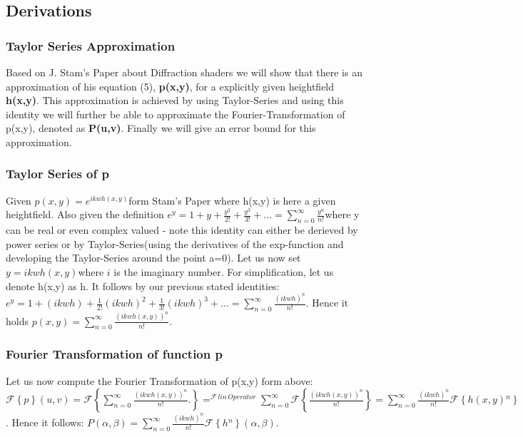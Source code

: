 \subsection{Derivations}
\subsubsection{Taylor Series Approximation}

Based on J. Stam's Paper about Diffraction shaders we will show that
there is an approximation of his equation (5), \textbf{p(x,y)}, for
a explicitly given heightfield \textbf{h(x,y)}. This approximation
is achieved by using Taylor-Series and using this identity we will
further be able to approximate the Fourier-Transformation of p(x,y),
denoted as \textbf{P(u,v)}. Finally we will give an error bound for
this approximation.

\subsubsection{Taylor Series of p}

Given $p(x,y)=e^{ikwh(x,y)}$form Stam's Paper where h(x,y) is here
a given heightfield. Also given the definition $e^{y}=1+y+\frac{y^{2}}{2!}+\frac{y^{3}}{3!}+...=\sum_{n=0}^{\infty}\frac{y^{n}}{n!}$where
y can be real or even complex valued - note this identity can either
be derieved by power series or by Taylor-Series(using the derivatives
of the exp-function and developing the Taylor-Series around the point
a=0). Let us now set $y=ikwh(x,y)$where $i$ is the imaginary number.
For simplification, let us denote h(x,y) as h. It follows by our previous
stated identities: $e^{y}=1+(ikwh)+\frac{1}{2!}(ikwh)^{2}+\frac{1}{3!}(ikwh)^{3}+...=\sum_{n=0}^{\infty}\frac{(ikwh)^{n}}{n!}$.
Hence it holds $p(x,y)=\sum_{n=0}^{\infty}\frac{(ikwh(x,y))^{n}}{n!}.$


\subsubsection{Fourier Transformation of function p}

Let us now compute the Fourier Transformation of p(x,y) form above:$\mathcal{F}\left\{ p\right\} (u,v)=\mathcal{F}\left\{ \sum_{n=0}^{\infty}\frac{(ikwh(x,y))^{n}}{n!}.\right\} =^{\mathcal{F}\, lin\, Operator}\sum_{n=0}^{\infty}\mathcal{F}\left\{ \frac{(ikwh(x,y))^{n}}{n!}\right\} =\sum_{n=0}^{\infty}\frac{(ikwh)^{n}}{n!}\mathcal{F}\left\{ h(x,y){}^{n}\right\} $.
Hence it follows: $P(\alpha,\beta)=\sum_{n=0}^{\infty}\frac{(ikwh)^{n}}{n!}\mathcal{F}\left\{ h{}^{n}\right\} (\alpha,\beta)$.

